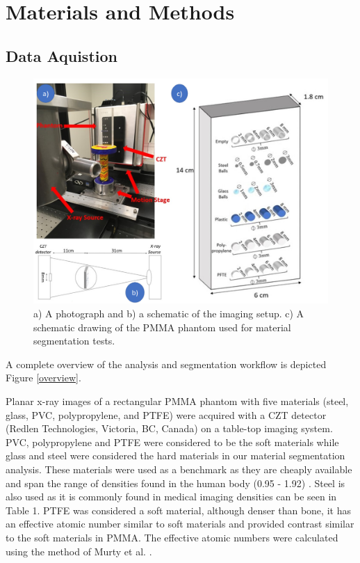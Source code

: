 \documentclass[a4paper,11pt]{article}
\begin{document}

\section{Materials and Methods}
\label{sec:methods}


\subsection{Data Aquistion}

\begin{figure}[htbp]


\includegraphics[width=\textwidth]{figures/aquisition2.png}

  
  \caption{a) A photograph and b) a schematic of the imaging setup. c) A schematic drawing of the PMMA phantom used for material segmentation tests.}
  \label{figure:setup}
\end{figure}

A complete overview of the analysis and segmentation workflow is depicted Figure \ref{overview}.

Planar x-ray images of a rectangular PMMA phantom with five materials (steel, glass, PVC, polypropylene, and PTFE) were acquired with a CZT detector (Redlen Technologies, Victoria, BC, Canada) on a table-top imaging system. PVC, polypropylene and PTFE were considered to be the soft materials while glass and steel were considered the hard materials in our material segmentation analysis. These materials were used as a benchmark as they are cheaply available and span the range of densities found in the human body (0.95 - 1.92) \cite{White1989Report44}. Steel is also used as it is commonly found in medical imaging densities can be seen in Table 1. PTFE was considered a soft material, although denser than bone, it has an effective atomic number similar to soft materials and provided contrast similar to the soft materials in PMMA. The effective atomic numbers were calculated using the method of Murty et al. \cite{MURTY1965EffectiveMaterials}.
\end{document}
